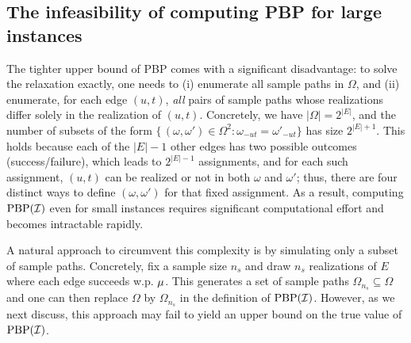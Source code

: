 {\subsection{The infeasibility of computing PBP for large instances}
\label{ssec: pbp_infeasible}

The tighter upper bound of PBP comes with a significant disadvantage: to solve the relaxation exactly, one needs to (i) enumerate all sample paths in $\Omega$, and (ii) enumerate,  for each edge $(u,t)$, \emph{all} pairs of sample paths 
whose realizations differ solely in the realization of $(u,t)$. 
Concretely, we have $\vert \Omega \vert = 2^{|E|}$, and the number of subsets of the form
$\{\,(\omega,\omega') \in \Omega^2 : \omega_{-ut} = \omega'_{-ut}\}$
has size $2^{|E|+1}$. 
This holds because each of the $|E|-1$ other edges has two possible outcomes (success/failure), which 
leads to $2^{|E|-1}$ assignments, 
and for each such assignment, $(u,t)$ can be realized or not in both $\omega$ and $\omega'$; thus, there are four distinct ways to define $(\omega,\omega')$ for that fixed assignment. As a result, computing $\mathrm{PBP}(\mathcal I)$ even for small instances requires significant computational effort and becomes intractable rapidly.

A natural approach to circumvent this complexity is by simulating only a subset of sample paths. Concretely, fix a sample size $n_s$ and draw $n_s$ realizations of $E$ where each edge succeeds w.p. $\mu$. This generates a set of sample paths $\Omega_{n_s} \subseteq \Omega$ and one can then replace $\Omega$ by $\Omega_{n_s}$ in the definition of $\mathrm{PBP}(\mathcal I)$. However, as we next discuss, this approach may fail to yield an upper bound on the true value of $\mathrm{PBP}(\mathcal I)$. 


}
